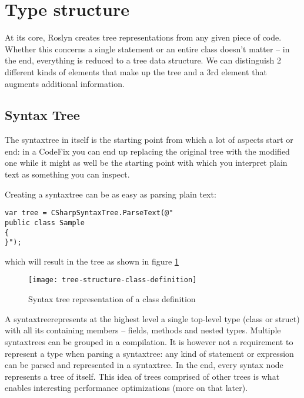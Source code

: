\section{Type structure}
\label{sec:type-structure}

At its core, Roslyn creates tree representations from any given piece of code. Whether this concerns a single statement or an entire class doesn't matter -- in the end, everything is reduced to a tree data structure. We can distinguish 2 different kinds of elements that make up the tree and a 3rd element that augments additional information.

\subsection{Syntax Tree}
\label{sec:syntax-tree}

The \gls{syntaxtree} in itself is the starting point from which a lot of aspects start or end: in a CodeFix you can end up replacing the original tree with the modified one while it might as well be the starting point with which you interpret plain text as something you can inspect.

Creating a \gls{syntaxtree} can be as easy as parsing plain text:

\begin{lstlisting}
var tree = CSharpSyntaxTree.ParseText(@"
public class Sample
{
}");
\end{lstlisting}

which will result in the tree as shown in figure \ref{fig:tree-structure-class-definition}

\begin{figure}[h]
\centering
\texttt{[image: tree-structure-class-definition]}
\caption{Syntax tree representation of a class definition}
\label{fig:tree-structure-class-definition}
\end{figure}

A \gls{syntaxtree}represents at the highest level a single top-level type (class or struct) with all its containing members -- fields, methods and nested types. Multiple \glspl{syntaxtree} can be grouped in a compilation. It is however not a requirement to represent a type when parsing a \gls{syntaxtree}: any kind of statement or expression can be parsed and represented in a \gls{syntaxtree}. In the end, every syntax node represents a tree of itself. This idea of trees comprised of other trees is what enables interesting performance optimizations (more on that later). 

